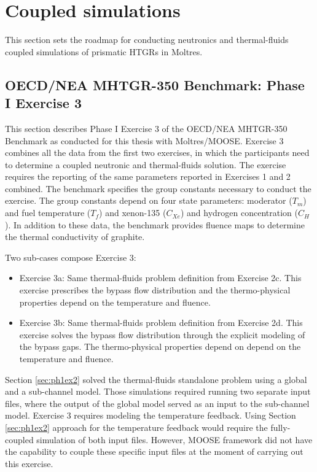 \section{Coupled simulations}
\label{sec:thermal-coupling}

This section sets the roadmap for conducting neutronics and thermal-fluids coupled simulations of prismatic HTGRs in Moltres.

\subsection{OECD/NEA MHTGR-350 Benchmark: Phase I Exercise 3}
\label{sec:ph1ex3}

This section describes Phase I Exercise 3 of the OECD/NEA MHTGR-350 Benchmark as conducted for this thesis with Moltres/MOOSE.
Exercise 3 combines all the data from the first two exercises, in which the participants need to determine a coupled neutronic and thermal-fluids solution.
The exercise requires the reporting of the same parameters reported in Exercises 1 and 2 combined.
The benchmark specifies the group constants necessary to conduct the exercise.
The group constants depend on four state parameters: moderator ($T_m$) and fuel temperature ($T_f$) and xenon-135 ($C_{Xe}$) and hydrogen concentration ($C_H$).
In addition to these data, the benchmark provides fluence maps to determine the thermal conductivity of graphite.

Two sub-cases compose Exercise 3:
\begin{itemize}
  \item Exercise 3a: Same thermal-fluids problem definition from Exercise 2c. This exercise prescribes the bypass flow distribution and the thermo-physical properties depend on the temperature and fluence.
  \item Exercise 3b: Same thermal-fluids problem definition from Exercise 2d. This exercise solves the bypass flow distribution through the explicit modeling of the bypass gaps. The thermo-physical properties depend on depend on the temperature and fluence.
\end{itemize}

Section \ref{sec:ph1ex2} solved the thermal-fluids standalone problem using a global and a sub-channel model.
Those simulations required running two separate input files, where the output of the global model served as an input to the sub-channel model.
Exercise 3 requires modeling the temperature feedback.
Using Section \ref{sec:ph1ex2} approach for the temperature feedback would require the fully-coupled simulation of both input files.
However, MOOSE framework did not have the capability to couple these specific input files at the moment of carrying out this exercise.

